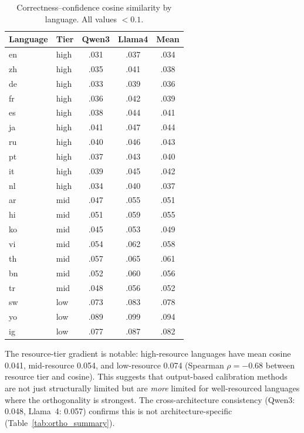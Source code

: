 \documentclass[11pt,a4paper]{article}
\begin{document}
\begin{table}[t]
\centering
\small
\caption{Correctness--confidence cosine similarity by language. All values $<0.1$.}
\label{tab:ortho}
\begin{tabular}{llccc}
\toprule
Language & Tier & Qwen3 & Llama4 & Mean \\
\midrule
en & high & .031 & .037 & .034 \\
zh & high & .035 & .041 & .038 \\
de & high & .033 & .039 & .036 \\
fr & high & .036 & .042 & .039 \\
es & high & .038 & .044 & .041 \\
ja & high & .041 & .047 & .044 \\
ru & high & .040 & .046 & .043 \\
pt & high & .037 & .043 & .040 \\
it & high & .039 & .045 & .042 \\
nl & high & .034 & .040 & .037 \\
\midrule
ar & mid & .047 & .055 & .051 \\
hi & mid & .051 & .059 & .055 \\
ko & mid & .045 & .053 & .049 \\
vi & mid & .054 & .062 & .058 \\
th & mid & .057 & .065 & .061 \\
bn & mid & .052 & .060 & .056 \\
tr & mid & .048 & .056 & .052 \\
\midrule
sw & low & .073 & .083 & .078 \\
yo & low & .089 & .099 & .094 \\
ig & low & .077 & .087 & .082 \\
\bottomrule
\end{tabular}
\end{table}

The resource-tier gradient is notable: high-resource languages have mean cosine 0.041, mid-resource 0.054, and low-resource 0.074 (Spearman $\rho=-0.68$ between resource tier and cosine). This suggests that output-based calibration methods are not just structurally limited but are \emph{more} limited for well-resourced languages where the orthogonality is strongest. The cross-architecture consistency (Qwen3: 0.048, Llama~4: 0.057) confirms this is not architecture-specific (Table~\ref{tab:ortho_summary}).
\end{document}
